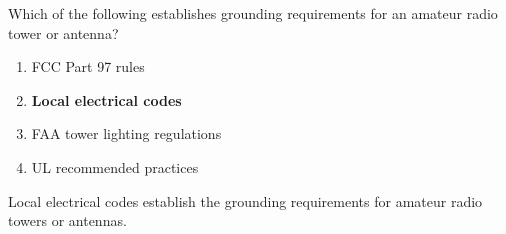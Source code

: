 \begin{tcolorbox}[colback=gray!10!white,colframe=black!75!black,title={T0B11}]
Which of the following establishes grounding requirements for an amateur radio tower or antenna?
\begin{enumerate}[label=\Alph*),noitemsep]
    \item FCC Part 97 rules
    \item \textbf{Local electrical codes}
    \item FAA tower lighting regulations
    \item UL recommended practices
\end{enumerate}
\end{tcolorbox}
Local electrical codes establish the grounding requirements for amateur radio towers or antennas.
